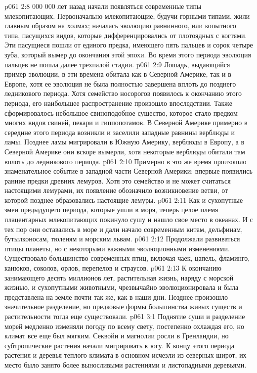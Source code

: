 \vs p061 2:8  000 000 лет назад начали появляться современные типы млекопитающих. Первоначально млекопитающие, будучи горными типами, жили главным образом на холмах;  началась эволюцию равнинного, или копытного типа, пасущихся видов, которые дифференцировались от плотоядных с когтями. Эти пасущиеся пошли от единого предка, имеющего пять пальцев и сорок четыре зуба, который вымер до окончания этой эпохи. Во время этого периода эволюция пальцев не пошла далее трехпалой стадии.
\vs p061 2:9 Лошадь, выдающийся пример эволюции, в эти времена обитала как в Северной Америке, так и в Европе, хотя ее эволюция не была полностью завершена вплоть до позднего ледникового периода. Хотя семейство носорогов появилось к окончанию этого периода, его наибольшее распространение произошло впоследствии. Также сформировалось небольшое свиноподобное существо, которое стало предком многих видов свиней, пекари и гиппопотамов. В Северной Америке примерно в середине этого периода возникли и заселили западные равнины верблюды и ламы. Позднее ламы мигрировали в Южную Америку, верблюды в Европу, а в Северной Америке они вскоре вымерли, хотя некоторые верблюды обитали там вплоть до ледникового периода.
\vs p061 2:10 Примерно в это же время произошло знаменательное событие в западной части Северной Америки: впервые появились ранние предки древних лемуров. Хотя это семейство и не может считаться настоящими лемурами, их появление обозначило возникновение ветви, от которой позднее образовались настоящие лемуры.
\vs p061 2:11 Как и сухопутные змеи предыдущего периода, которые ушли в моря, теперь целое племя плацентарных млекопитающих покинуло сушу и нашло свое место в океанах. И с тех пор они оставались в море и дали начало современным китам, дельфинам, бутылконосам, тюленям и морским львам.
\vs p061 2:12 Продолжали развиваться птицы планеты, но с некоторыми важными эволюционными изменениями. Существовало большинство современных птиц, включая чаек, цапель, фламинго, канюков, соколов, орлов, перепелов и страусов.
\vs p061 2:13 \pc К окончанию  занимающего десять миллионов лет, растительная жизнь, наряду с морской жизнью, и сухопутными животными, чрезвычайно эволюционировала и была представлена на земле почти так же, как в наши дни. Позднее произошло значительное разделение, но предковые формы большинства живых существ и растительности тогда еще существовали.
\vs p061 3:1 Поднятие суши и разделение морей медленно изменяли погоду по всему свету, постепенно охлаждая его, но климат все еще был мягким. Секвойи и магнолии росли в Гренландии, но субтропические растения начали мигрировать к югу. К концу этого периода растения и деревья теплого климата в основном исчезли из северных широт, их место было занято более выносливыми растениями и листопадными деревьями.
